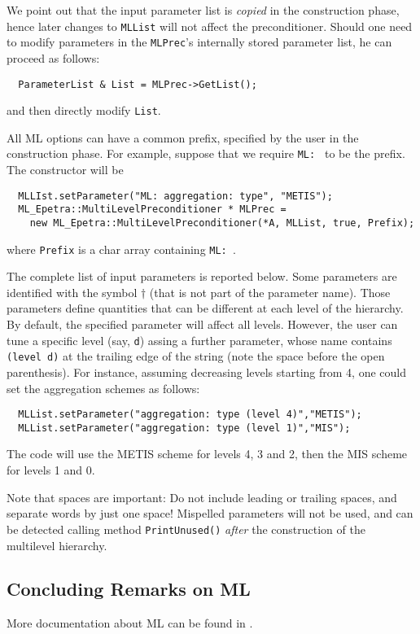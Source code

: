 We point out that the input parameter list is {\sl copied} in the
construction phase, hence later changes to \verb!MLList! will not affect
the preconditioner. Should one need to modify parameters in the
\verb!MLPrec!'s internally stored parameter list, he can proceed as
follows:
\begin{verbatim}
  ParameterList & List = MLPrec->GetList();
\end{verbatim}
and then directly modify \verb!List!.

\medskip

All ML options can have a common prefix, specified by the
user in the construction phase. For example, suppose that we require
\verb!ML: ! to be the prefix. The constructor will be
\begin{verbatim}
  MLLIst.setParameter("ML: aggregation: type", "METIS");
  ML_Epetra::MultiLevelPreconditioner * MLPrec = 
    new ML_Epetra::MultiLevelPreconditioner(*A, MLList, true, Prefix);
\end{verbatim}
where \verb!Prefix! is a char array containing \verb!ML: !.

The complete list of input parameters is reported below. Some parameters
are identified with the symbol $\dagger$ (that is not part of the
parameter name). Those parameters define quantities that can be
different at each level of the hierarchy. By default, the specified
parameter will affect all levels. However, the user can tune a specific
level (say, \verb!d!) assing a further parameter, whose name contains
\verb! (level d)! at the trailing edge of the string (note the space
before the open parenthesis). For instance,  assuming
decreasing levels starting from 4, one could set the aggregation schemes
as follows:
\begin{verbatim}
  MLList.setParameter("aggregation: type (level 4)","METIS");
  MLList.setParameter("aggregation: type (level 1)","MIS");
\end{verbatim}
The code will use the METIS scheme for levels 4, 3 and 2, then the MIS
scheme for levels 1 and 0.

Note that spaces are important: Do not include leading or trailing
spaces, and separate words by just one space! Mispelled parameters will
not be used, and can be detected calling method \verb!PrintUnused()!
{\sl after} the construction of the multilevel hierarchy. 


\subsection{Concluding Remarks on ML}
\label{sec:ml_concluding}

More documentation about ML can be found in
\cite{ML-home-page,TuminaroTong:00,TuminaroTong:00}.

